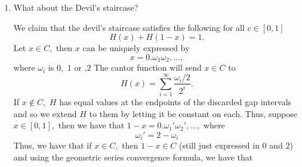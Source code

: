 \documentclass[11pt]{article}
\begin{document}
\begin{enumerate}
\begin{solution}
    
    Zeno's staircase is constructed as follows: \[Z(x) = \sum_{k=1}^n\frac{1}{2^k}, x\in [\sum_{k=1}^{n-1}\frac{1}{2^k}, \sum_{k=1}^n\frac{1}{2^k}).\] For example, for $n=1,$ we have that $Z(x) = \frac{1}{2}$ for $x\in [0, \frac{1}{2}).$ and $Z(x) = \frac{3}{4}$ for $x\in [\frac{1}{2}, \frac{3}{4}).$ We have that $Z$ is integrable on $[0,1]$ by the Riemann-Lebesgue, since the set of discontinuities is countable, since each one happens every $\frac{2^n -1}{2^n}.$ Thus, we have that 
    \begin{align*}
        \int_0^1 Z(x) &= \int_0^\frac{1}{2}Z(x) + \int_\frac{1}{2}^\frac{3}{4}Z(x) + \int_\frac{3}{4}^{\frac{7}{8}}Z(x) + \dots\\
        &= \lim_{n\to \infty}\sum_{k=1}^n\int_{\sum_{k=1}^{n-1}\frac{1}{2^k}}^{\sum_{k=1}^n\frac{1}{2^k}}\sum_{k=1}^n\frac{1}{2^k}dx\\
        &= \lim_{n\to \infty }\left(\frac{1}{2}\frac{1}{2} + \frac{1}{4}\frac{3}{4} + \frac{1}{8}\frac{7}{8} + \dots + \frac{1}{2^n}\sum_{k=1}^n\frac{1}{2^k}\right)\\
        &= \lim_{n\to \infty} \left(\sum_{k=1}^n\frac{1}{2^k}\frac{2^{k}-1}{2^k}\right)\\
        &= \lim_{n\to \infty}\left(\sum_{k=1}^n\frac{2^k -1}{2^{2k}}\right)\\
        &= \lim_{n\to \infty}\left(\sum_{k=1}^n(\frac{1}{2})^k - \sum_{k=1}^n(\frac{1}{4})^k\right)\\
        &= 2- \frac{4}{3}\\
        &= \frac{2}{3}.
    \end{align*} Where we used the geometric series formula.
    \end{solution}
\item 
\begin{problem}
    What about the Devil’s staircase?
\end{problem}
\begin{solution}
We claim that the devil's staircase satisfies the following for all $c\in [0,1]$
\[H(x)  + H(1-x) = 1.\] 
Let $x\in C,$ then $x$ can be uniquely expressed by 
\[x = 0.\omega_1\omega_2, \dots,\] where $\omega_i$ is $0,$ $1$ or ,$2$  The cantor function will send $x\in C$ to 
\[H(x) = \sum_{i=1}^\infty \frac{\omega_i/2}{2^i}.\] If $x\notin C,$ $H$ has equal values at the endpoints of the discarded gap intervals and so we extend
$H$ to them by letting it be constant on each. Thus, suppose $x\in [0,1],$ then we have that $1 - x=  0.\omega_1'\omega_2', \dots,$ where \[\omega_i' = 2 - \omega_i\] Thus, we have that if $x\in C,$ then $1-x \in C$ (still just expressed in $0$ and $2$) and using the geometric series convergence formula, we have that

\end{solution}
\end{enumerate}
\end{document}

